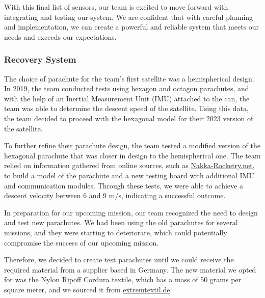 \documentclass[11pt]{article}
\begin{document}
With this final list of sensors, our team is excited to move forward with integrating and testing our system. We are confident that with careful planning and implementation, we can create a powerful and reliable system that meets our needs and exceeds our expectations.



\subsubsection*{Recovery System}
The choice of parachute for the team's first satellite was a hemispherical design. In 2019, the team conducted tests using hexagon and octagon parachutes, and with the help of an Inertial Measurement Unit (IMU) attached to the can, the team was able to determine the descent speed of the satellite. Using this data, the team decided to proceed with the hexagonal model for their 2023 version of the satellite.

To further refine their parachute design, the team tested a modified version of the hexagonal parachute that was closer in design to the hemispherical one. The team relied on information gathered from online sources, such as \href{https://www.nakka-rocketry.net/paracon.html}{Nakka-Rocketry.net}, to build a model of the parachute and a new testing board with additional IMU and communication modules. Through these tests, we were able to achieve a descent velocity between 6 and 9  m/s, indicating a successful outcome.

In preparation for our upcoming mission, our team recognized the need to design and test new parachutes. We had been using the old parachutes for several missions, and they were starting to deteriorate, which could potentially compromise the success of our upcoming mission.

Therefore, we decided to create test parachutes until we could receive the required material from a supplier based in Germany. The new material we opted for was the Nylon Ripoff Cordura textile, which has a mass of 50 grams per square meter, and we sourced it from \href{https://www.extremtextil.de/}{extremtextil.de}.
\end{document}
